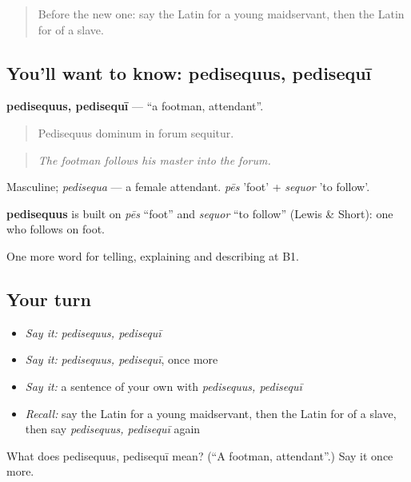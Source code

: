 \label{lesson:LA-C530-pedisequus}



\begin{quote}
Before the new one: say the Latin for a young maidservant, then the Latin for of a slave.
\end{quote}

\subsection*{You'll want to know: pedisequus, pedisequī}
\textbf{pedisequus, pedisequī} — \textquotedblleft{}a footman, attendant\textquotedblright{}.

\begin{quote}
Pedisequus dominum in forum sequitur.
\end{quote}

\begin{quote}
\emph{The footman follows his master into the forum.}
\end{quote}

Masculine; \emph{pedisequa} — a female attendant. \emph{pēs} 'foot' + \emph{sequor} 'to follow'.

\begin{cousinweb}
\textbf{pedisequus} is built on \emph{pēs} \textquotedblleft{}foot\textquotedblright{} and \emph{sequor} \textquotedblleft{}to follow\textquotedblright{} (Lewis \& Short): one who follows on foot.
\end{cousinweb}

\begin{grammarlens}[title={What you've built}]
One more word for telling, explaining and describing at B1.
\end{grammarlens}

\subsection*{Your turn}
\begin{itemize}
\raggedright
  \item \emph{Say it:} \emph{pedisequus, pedisequī}
  \item \emph{Say it:} \emph{pedisequus, pedisequī}, once more
  \item \emph{Say it:} a sentence of your own with \emph{pedisequus, pedisequī}
  \item \emph{Recall:} say the Latin for a young maidservant, then the Latin for of a slave, then say \emph{pedisequus, pedisequī} again
\end{itemize}

\begin{tcolorbox}[breakable,colback=teal!4,colframe=teal!35!black,title={Before you move on}]
What does pedisequus, pedisequī mean? (\textquotedblleft{}A footman, attendant\textquotedblright{}.) Say it once more.
\end{tcolorbox}
